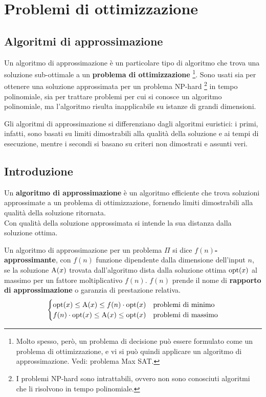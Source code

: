 \section{Problemi di ottimizzazione}
\subsection{Algoritmi di approssimazione}
Un algoritmo di approssimazione è un particolare tipo di algoritmo che trova una soluzione sub-ottimale a un \textbf{problema di ottimizzazione} \footnote{Molto spesso, però, un problema di decisione può essere formulato come un problema di ottimizzazione, e vi si può quindi applicare un algoritmo di approssimazione. Vedi: problema Max SAT.}.
Sono usati sia per ottenere una soluzione approssimata per un problema NP-hard \footnote[][1cm]{I problemi NP-hard sono intrattabili, ovvero non sono conosciuti algoritmi che li risolvono in tempo polinomiale.} in tempo polinomiale, sia per trattare problemi per cui si conosce un algoritmo polinomiale, ma l'algoritmo risulta inapplicabile su istanze di grandi dimensioni.

Gli algoritmi di approssimazione si differenziano dagli algoritmi euristici: i primi, infatti, sono basati su limiti dimostrabili alla qualità della soluzione e ai tempi di esecuzione, mentre i secondi si basano su criteri non dimostrati e assunti veri.

\subsection*{Introduzione}
\begin{defn}
    Un \textbf{algoritmo di approssimazione} è un algoritmo efficiente che trova soluzioni approssimate a un problema di ottimizzazione, fornendo limiti dimostrabili alla qualità della soluzione ritornata.\\
    Con qualità della soluzione approssimata si intende la sua distanza dalla soluzione ottima.
\end{defn}


\begin{defn}
    Un algoritmo di approssimazione per un problema $\Pi$ si dice \textbf{$f(n)$-approssimante}, con $f(n)$ funzione dipendente dalla dimensione dell'input $n$, se la soluzione $\textnormal{A}(x)$ trovata dall'algoritmo dista dalla soluzione ottima $\textnormal{opt}(x)$ al massimo per un fattore moltiplicativo $f(n)$.
    $f(n)$ prende il nome di \textbf{rapporto di approssimazione} o garanzia di prestazione relativa.
    \[
    \begin{cases}
        \textnormal{opt}(x) \le \textnormal{A}(x) \le f(n) \cdot \textnormal{opt}(x) & \textnormal{problemi di minimo}\\
        f(n) \cdot \textnormal{opt}(x) \le \textnormal{A}(x) \le \textnormal{opt}(x) & \textnormal{problemi di massimo}
    \end{cases}
    \]
\end{defn}

